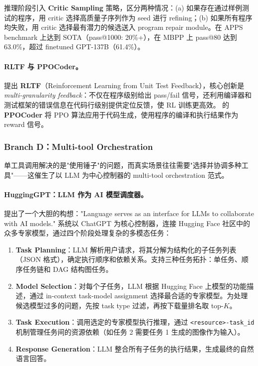推理阶段引入 \textbf{Critic Sampling} 策略，区分两种情况：(a) 如果存在通过样例测试的程序，用 critic 选择高质量子序列作为 seed 进行 refining；(b) 如果所有程序均失败，用 critic 选择最有潜力的候选送入 program repair module。在 APPS benchmark 上达到 SOTA（pass@1000: 20\%+），在 MBPP 上 pass@80 达到 63.0\%，超过 finetuned GPT-137B（61.4\%）。

\paragraph{RLTF 与 PPOCoder。}
\citet{liu2023rltf} 提出 \textbf{RLTF}（Reinforcement Learning from Unit Test Feedback），核心创新是 \emph{multi-granularity feedback}：不仅在程序级别给出 pass/fail 信号，还利用编译器和测试框架的错误信息在代码行级别提供定位反馈，使 RL 训练更高效。\citet{shojaee2023ppocoder} 的 \textbf{PPOCoder} 将 PPO 算法应用于代码生成，使用程序的编译和执行结果作为 reward 信号。

\subsubsection{Branch D：Multi-tool Orchestration}

单工具调用解决的是"使用锤子"的问题，而真实场景往往需要"选择并协调多种工具"——这催生了以 LLM 为中心控制器的 multi-tool orchestration 范式。

\paragraph{HuggingGPT：LLM 作为 AI 模型调度器。}
 提出了一个大胆的构想："Language serves as an interface for LLMs to collaborate with AI models." 系统以 ChatGPT 为核心控制器，连接 Hugging Face 社区中的众多专家模型，通过四个阶段处理复杂的多模态任务：

\begin{enumerate}[leftmargin=*]
  \item \textbf{Task Planning}：LLM 解析用户请求，将其分解为结构化的子任务列表（JSON 格式），确定执行顺序和依赖关系。支持三种任务拓扑：单任务、顺序任务链和 DAG 结构图任务。
  \item \textbf{Model Selection}：对每个子任务，LLM 根据 Hugging Face 上模型的功能描述，通过 in-context task-model assignment 选择最合适的专家模型。为处理候选模型过多的问题，先按 task type 过滤，再按下载量排名取 top-$K$。
  \item \textbf{Task Execution}：调用选定的专家模型执行推理，通过 \texttt{<resource>-task\_id} 机制管理任务间的资源依赖（如任务 2 需要任务 1 生成的图像作为输入）。
  \item \textbf{Response Generation}：LLM 整合所有子任务的执行结果，生成最终的自然语言回答。
\end{enumerate}

